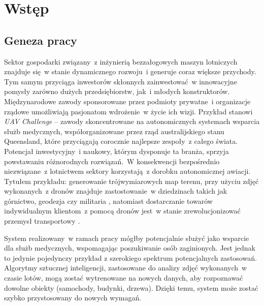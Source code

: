\chapter{Wstęp} \label{chapter_intro}


\section{Geneza pracy} \label{intro_genesis}

Sektor gospodarki związany~z inżynierią bezzałogowych maszyn lotniczych znajduje się~w
stanie dynamicznego rozwoju~i generuje coraz większe przychody.
Tym samym przyciąga inwestorów skłonnych zainwestować~w innowacyjne pomysły zarówno 
dużych przedsiębiorstw, jak~i młodych konstruktorów. Międzynarodowe zawody sponsorowane
przez podmioty prywatne~i organizacje rządowe umożliwiają pasjonatom wdrożenie~w życie
ich wizji. Przykład stanowi \textit{UAV Challenge} -- zawody skoncentrowane na
autonomicznych systemach wsparcia służb medycznych, współorganizowane przez rząd
australijskiego stanu Queensland, które przyciągają corocznie najlepsze zespoły~z całego
świata\cite{uav_sponsors}. Potencjał inwestycyjny~i naukowy, którym dysponuje ta branża,
sprzyja powstawaniu różnorodnych rozwiązań.~W konsekwencji bezpośrednio niezwiązane~z lotnictwem sektory korzystają~z dorobku autonomicznej awiacji.
Tytułem przykładu: generowanie trójwymiarowych map terenu, przy użyciu zdjęć wykonanych~z dronów znajduje
zastostowanie~w dziedzinach takich jak górnictwo, geodezja czy militaria
\cite{uav_photogrametry}, natomiast dostarczanie towarów indywidualnym klientom~z pomocą
dronów jest~w stanie zrewolucjonizować przemysł transportowy \cite{prime_air}.


System realizowany~w ramach pracy mógłby potencjalnie służyć jako wsparcie dla służb
medycznych, wspomagając poszukiwanie osób zaginionych. Jest jednak to jedynie pojedynczy 
przykład z szerokiego spektrum potencjalnych zastosowań. Algorytmy sztucznej inteligencji,
zastosowane do analizy zdjęć wykonanych~w czasie lotów, mogą zostać wytrenowane
na nowych danych, aby rozpoznawać dowolne obiekty (samochody, budynki, drzewa). 
Dzięki temu, system może zostać szybko przystosowany do nowych wymagań. 

